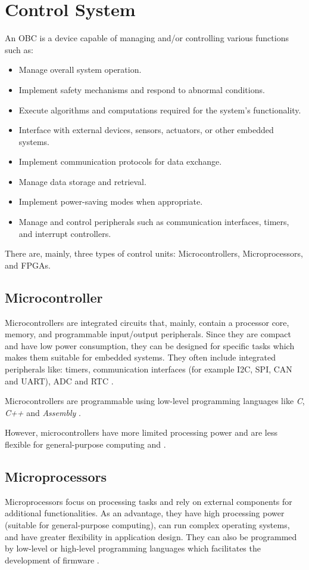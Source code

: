 \section{Control System}
An \gls{OBC} is a device capable of managing and/or controlling various functions such as:
\begin{itemize}
    \item Manage overall system operation.
    \item Implement safety mechanisms and respond to abnormal conditions.
    \item Execute algorithms and computations required for the system's functionality.
    \item Interface with external devices, sensors, actuators, or other embedded systems.
    \item Implement communication protocols for data exchange.
    \item Manage data storage and retrieval.
    \item Implement power-saving modes when appropriate.
    \item Manage and control peripherals such as communication interfaces, timers, and interrupt controllers.
\end{itemize}

There are, mainly, three types of control units: Microcontrollers, Microprocessors, and \glspl{FPGA}.

\subsection{Microcontroller}
Microcontrollers are integrated circuits that, mainly, contain a processor core, memory, and programmable input/output peripherals.
Since they are compact and have low power consumption, they can be designed for specific tasks which makes them suitable for embedded systems.
They often include integrated peripherals like: timers, communication interfaces (for example \gls{I2C}, \gls{SPI}, \gls{CAN} and \gls{UART}), \gls{ADC} and \gls{RTC} \cite{OBC1}.

Microcontrollers are programmable using low-level programming languages like \textit{C}, \textit{C++} and \textit{Assembly} \cite{OBC1}.

However, microcontrollers have more limited processing power and are less flexible for general-purpose computing \cite{OBC1} and \cite{OBC2}.


\subsection{Microprocessors}
Microprocessors focus on processing tasks and rely on external components for additional functionalities.
As an advantage, they have high processing power (suitable for general-purpose computing), can run complex operating systems, and have greater flexibility in application design.
They can also be programmed by low-level or high-level programming languages which facilitates the development of firmware \cite{OBC5}.

